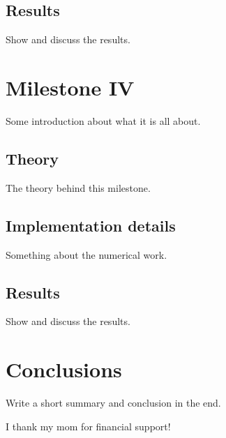 \documentclass{aa}
\begin{document}
\subsection{Results}
Show and discuss the results.

\section{Milestone IV}
Some introduction about what it is all about.

\subsection{Theory}
The theory behind this milestone.

\subsection{Implementation details}
Something about the numerical work.

\subsection{Results}
Show and discuss the results.

\section{Conclusions}

Write a short summary and conclusion in the end. 

\begin{acknowledgements}
      I thank my mom for financial support!
\end{acknowledgements}




% 

\end{document}

